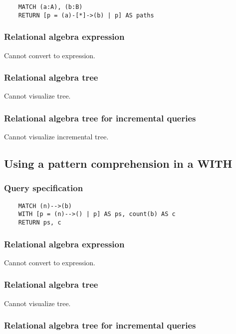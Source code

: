 	\begin{lstlisting}
	MATCH (a:A), (b:B)
	RETURN [p = (a)-[*]->(b) | p] AS paths
	\end{lstlisting}


	\subsubsection*{Relational algebra expression}

	Cannot convert to expression.

	\subsubsection*{Relational algebra tree}

	Cannot visualize tree.

	\subsubsection*{Relational algebra tree for incremental queries}

	Cannot visualize incremental tree.
	\subsection{Using a pattern comprehension in a WITH}

	\subsubsection*{Query specification}

	\begin{lstlisting}
	MATCH (n)-->(b)
	WITH [p = (n)-->() | p] AS ps, count(b) AS c
	RETURN ps, c
	\end{lstlisting}


	\subsubsection*{Relational algebra expression}

	Cannot convert to expression.

	\subsubsection*{Relational algebra tree}

	Cannot visualize tree.

	\subsubsection*{Relational algebra tree for incremental queries}

